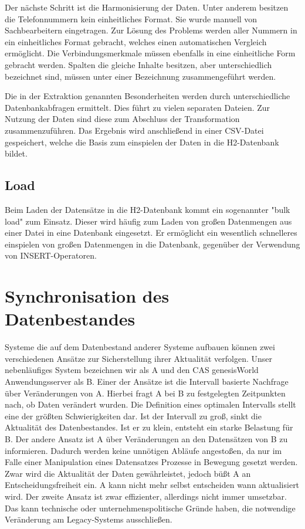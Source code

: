 Der nächste Schritt ist die Harmonisierung der Daten. Unter anderem besitzen die Telefonnummern kein einheitliches Format. Sie wurde manuell von Sachbearbeitern eingetragen. Zur Lösung des Problems werden aller Nummern in ein einheitliches Format gebracht, welches einen automatischen Vergleich ermöglicht. Die Verbindungsmerkmale müssen ebenfalls in eine einheitliche Form gebracht werden. Spalten die gleiche Inhalte besitzen, aber unterschiedlich bezeichnet sind, müssen unter einer Bezeichnung zusammengeführt werden. 

Die in der Extraktion genannten Besonderheiten werden durch unterschiedliche Datenbankabfragen ermittelt. Dies führt zu vielen separaten Dateien. Zur Nutzung der Daten sind diese zum Abschluss der Transformation zusammenzuführen. Das Ergebnis wird anschließend in einer CSV-Datei gespeichert, welche die Basis zum einspielen der Daten in die H2-Datenbank bildet. 

\subsection{Load}

Beim Laden der Datensätze in die H2-Datenbank kommt ein sogenannter "bulk load" zum Einsatz. Dieser wird häufig zum Laden von großen Datenmengen aus einer Datei in eine Datenbank eingesetzt. Er ermöglicht ein wesentlich schnelleres einspielen von großen Datenmengen in die Datenbank, gegenüber der Verwendung von INSERT-Operatoren.

\section{Synchronisation des Datenbestandes}
\label{ch:Konzeption:sec:updatedatenbestand}

Systeme die auf dem Datenbestand anderer Systeme aufbauen können zwei verschiedenen Ansätze zur Sicherstellung ihrer Aktualität verfolgen. Unser nebenläufiges System bezeichnen wir als A und den CAS genesisWorld Anwendungsserver als B. Einer der Ansätze ist die Intervall basierte Nachfrage über Veränderungen von A. Hierbei fragt A bei B zu festgelegten Zeitpunkten nach, ob Daten verändert wurden. Die Definition eines optimalen Intervalls stellt eine der größten Schwierigkeiten dar. Ist der Intervall zu groß, sinkt die Aktualität des Datenbestandes. Ist er zu klein, entsteht  ein starke Belastung für B. Der andere Ansatz ist A über Veränderungen an den Datensätzen von B zu informieren. Dadurch werden keine unnötigen Abläufe angestoßen, da nur im Falle einer Manipulation eines Datensatzes Prozesse in Bewegung gesetzt werden. Zwar wird die Aktualität der Daten gewährleistet, jedoch büßt A an Entscheidungsfreiheit ein. A kann nicht mehr selbst entscheiden wann aktualisiert wird. Der zweite Ansatz ist zwar effizienter, allerdings nicht immer umsetzbar. Das kann technische oder unternehmenspolitische Gründe haben, die notwendige Veränderung am Legacy-Systems ausschließen.  

